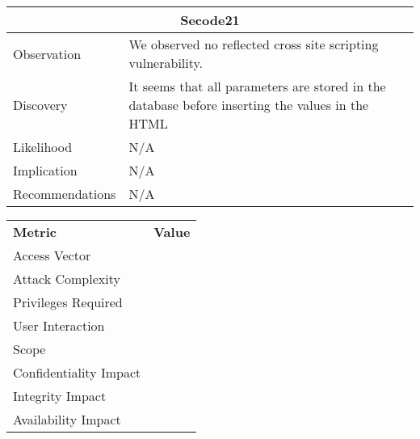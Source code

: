 \documentclass[headsepline,footsepline,footinclude=false,oneside,fontsize=11pt,paper=a4,listof=totoc,bibliography=totoc]{scrbook} %
\begin{document}
\begin{tabular}{ p{3cm}|p{13cm}  }
	\hline
	\multicolumn{2}{c}{\textbf{Secode21}} \\ 
	\hline
	Observation   & We observed no reflected cross site scripting vulnerability.    \\
	Discovery  &   It seems that all parameters are stored in the database before inserting the values in the HTML  \\
	Likelihood & N/A \\
	Implication    & N/A \\
	Recommendations& N/A \\ 
	\hline
\end{tabular}
\newline
\vspace{0.5cm}
\newline
\begin{center}
	\begin{tabular}{ll}
		\rowcolor[HTML]{34CDF9} 
		{\color[HTML]{ECF4FF} \textbf{Metric}}        & {\color[HTML]{ECF4FF} \textbf{Value}} \\
		\rowcolor[HTML]{BBDAFF} 
		{\color[HTML]{333333} Access Vector}          & {\color[HTML]{333333} }               \\
		\rowcolor[HTML]{ECF4FF} 
		{\color[HTML]{333333} Attack Complexity}      & {\color[HTML]{333333} }               \\
		\rowcolor[HTML]{BBDAFF} 
		{\color[HTML]{333333} Privileges Required}    & {\color[HTML]{333333} }               \\
		\rowcolor[HTML]{ECF4FF} 
		{\color[HTML]{333333} User Interaction}       & {\color[HTML]{333333} }               \\
		\rowcolor[HTML]{BBDAFF} 
		{\color[HTML]{333333} Scope}                  & {\color[HTML]{333333} }               \\
		\rowcolor[HTML]{ECF4FF} 
		{\color[HTML]{333333} Confidentiality Impact} & {\color[HTML]{333333} }               \\
		\rowcolor[HTML]{BBDAFF} 
		{\color[HTML]{333333} Integrity Impact}       & {\color[HTML]{333333} }               \\
		\rowcolor[HTML]{ECF4FF} 
		{\color[HTML]{333333} Availability Impact}    & {\color[HTML]{333333} }              
	\end{tabular}
\end{center}
\end{document}
